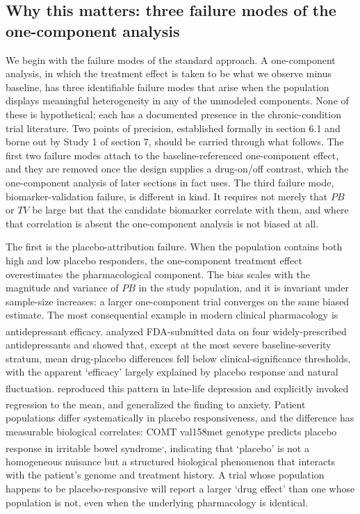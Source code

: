 \documentclass[
  11pt,
]{article}
\begin{document}
\subsection{Why this matters: three failure modes of the one-component analysis}\label{why-this-matters-three-failure-modes-of-the-one-component-analysis}

We begin with the failure modes of the standard approach. A one-component
analysis, in which the treatment effect is taken to be what we observe minus
baseline, has three identifiable failure modes that arise when the population
displays meaningful heterogeneity in any of the unmodeled components. None of
these is hypothetical; each has a documented presence in the chronic-condition
trial literature. Two points of precision, established formally in section 6.1
and borne out by Study 1 of section 7, should be carried through what
follows. The first two failure modes attach to the baseline-referenced
one-component effect, and they are removed once the design supplies a
drug-on/off contrast, which the one-component analysis of later sections in
fact uses. The third failure mode, biomarker-validation failure, is different
in kind. It requires not merely that \(PB\) or \(TV\) be large but that the
candidate biomarker correlate with them, and where that correlation is absent
the one-component analysis is not biased at all.

The first is the placebo-attribution failure. When the population contains
both high and low placebo responders, the one-component treatment effect
overestimates the pharmacological component. The bias scales with the
magnitude and variance of \(PB\) in the study population, and it is invariant
under sample-size increases: a larger one-component trial converges on the
same biased estimate. The most consequential example in modern clinical
pharmacology is antidepressant efficacy.\textsuperscript{} analyzed FDA-submitted
data on four widely-prescribed antidepressants and showed that, except at the
most severe baseline-severity stratum, mean drug-placebo differences fell
below clinical-significance thresholds, with the apparent `efficacy' largely
explained by placebo response and natural fluctuation.\textsuperscript{} reproduced
this pattern in late-life depression and explicitly invoked regression to the
mean, and\textsuperscript{} generalized the finding to anxiety. Patient
populations differ systematically in placebo responsiveness, and the
difference has measurable biological correlates: COMT val158met genotype
predicts placebo response in irritable bowel syndrome\textsuperscript{,}, indicating that `placebo' is not a homogeneous nuisance but a
structured biological phenomenon that interacts with the patient's genome and
treatment history. A trial whose population happens to be placebo-responsive
will report a larger `drug effect' than one whose population is not, even when
the underlying pharmacology is identical.
\end{document}
